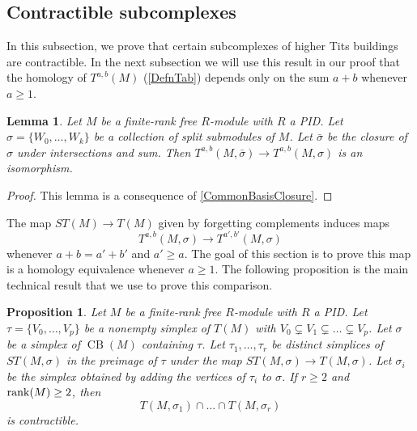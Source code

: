 \documentclass[a4paper]{amsart}
\DeclareMathOperator{\CB}{CB}
\newcommand{\m}{\to}
\numberwithin{theoremcounter}{section}
\newtheorem{lemma}[lemmaauto]{Lemma}
\newtheorem{proposition}[propositionauto]{Proposition}
\theoremstyle{definition}
\theoremstyle{remark}
\newcommand{\mr}[1]{{\rm #1}}
\newcommand{\rank}{\mr{rank}}
\begin{document}
\subsection{Contractible subcomplexes}

In this subsection, we prove that certain subcomplexes of higher Tits buildings are contractible. In the next subsection we will use this result in our proof that the homology of $T^{a,b}(M)$ (\autoref{DefnTab}) depends only on the sum $a+b$ whenever $a \geq 1$. 

\begin{lemma} \label{sigmaClosure}
Let $M$ be a finite-rank free $R$-module with $R$ a PID.  Let $\sigma=\{W_0,\dots,W_k \}$ be a collection of split submodules of $M$. Let $\bar \sigma$ be the closure of $\sigma$ under intersections and sum. Then $T^{a,b}(M,\bar \sigma) \m T^{a,b}(M, \sigma)$ is an isomorphism.
\end{lemma}

\begin{proof} This lemma is a consequence of \autoref{CommonBasisClosure}. 
\end{proof} 


The map $ST(M) \m T(M)$ given by forgetting complements induces maps $$T^{a,b}(M,\sigma) \m T^{a',b'}(M,\sigma)$$ whenever $a+b=a'+b'$ and $a' \geq a$. The goal of this section is to prove this map is a homology equivalence whenever $a \geq 1$. The following proposition is the main technical result that we use to prove this comparison.

\begin{proposition} \label{ContractibleTits}
Let $M$ be a finite-rank free $R$-module with $R$ a PID.  Let $\tau=\{V_0, \dots,V_p\}$ be a nonempty simplex of $T(M)$ with $V_0 \subsetneq V_1 \subsetneq \dots \subsetneq V_p$. Let $\sigma$ be a simplex of ${\CB}(M)$ containing $\tau$. Let $\tau_1,\dots,\tau_r$ be distinct simplices of $ST(M,\sigma)$ in the preimage of $\tau$ under the map $ST(M,\sigma) \m T(M,\sigma)$.  Let $\sigma_i$ be the simplex obtained by adding the vertices of $\tau_i$ to $\sigma$. If $r \geq 2$ and $\rank (M) \geq 2$, then $$T(M,\sigma_1) \cap \dots \cap T(M,\sigma_r) $$ is contractible.
\end{proposition}
\end{document}
